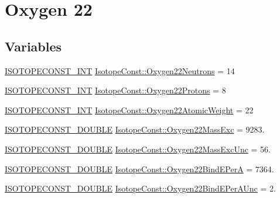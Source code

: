 \hypertarget{group___isotope_const-_oxygen-_o22}{}\section{Oxygen 22}
\label{group___isotope_const-_oxygen-_o22}
\subsection*{Variables}
\begin{DoxyCompactItemize}
\item 
\mbox{\hyperlink{group___isotope_const-_macros_ga5f18360b3e99483a35c32d789e62621c}{I\+S\+O\+T\+O\+P\+E\+C\+O\+N\+S\+T\+\_\+\+I\+NT}} \mbox{\hyperlink{group___isotope_const-_oxygen-_o22_gaab540bf3098885ffaa97b6f7363a1b3e}{Isotope\+Const\+::\+Oxygen22\+Neutrons}} = 14
\item 
\mbox{\hyperlink{group___isotope_const-_macros_ga5f18360b3e99483a35c32d789e62621c}{I\+S\+O\+T\+O\+P\+E\+C\+O\+N\+S\+T\+\_\+\+I\+NT}} \mbox{\hyperlink{group___isotope_const-_oxygen-_o22_ga3201a642435c22358206aefff772d6ca}{Isotope\+Const\+::\+Oxygen22\+Protons}} = 8
\item 
\mbox{\hyperlink{group___isotope_const-_macros_ga5f18360b3e99483a35c32d789e62621c}{I\+S\+O\+T\+O\+P\+E\+C\+O\+N\+S\+T\+\_\+\+I\+NT}} \mbox{\hyperlink{group___isotope_const-_oxygen-_o22_ga62ae155ee6c1689b5ac4e7338f58abd2}{Isotope\+Const\+::\+Oxygen22\+Atomic\+Weight}} = 22
\item 
\mbox{\hyperlink{group___isotope_const-_macros_ga8f45a7272ce02c0b4c65c44636ed719a}{I\+S\+O\+T\+O\+P\+E\+C\+O\+N\+S\+T\+\_\+\+D\+O\+U\+B\+LE}} \mbox{\hyperlink{group___isotope_const-_oxygen-_o22_gac89fcb1003fffecc83ee7ad3992a1fe1}{Isotope\+Const\+::\+Oxygen22\+Mass\+Exc}} = 9283.
\item 
\mbox{\hyperlink{group___isotope_const-_macros_ga8f45a7272ce02c0b4c65c44636ed719a}{I\+S\+O\+T\+O\+P\+E\+C\+O\+N\+S\+T\+\_\+\+D\+O\+U\+B\+LE}} \mbox{\hyperlink{group___isotope_const-_oxygen-_o22_gacb4b2a9167f8c9439bff7644a49f0099}{Isotope\+Const\+::\+Oxygen22\+Mass\+Exc\+Unc}} = 56.
\item 
\mbox{\hyperlink{group___isotope_const-_macros_ga8f45a7272ce02c0b4c65c44636ed719a}{I\+S\+O\+T\+O\+P\+E\+C\+O\+N\+S\+T\+\_\+\+D\+O\+U\+B\+LE}} \mbox{\hyperlink{group___isotope_const-_oxygen-_o22_ga26b81d13d47f204d8797848372bf8782}{Isotope\+Const\+::\+Oxygen22\+Bind\+E\+PerA}} = 7364.
\item 
\mbox{\hyperlink{group___isotope_const-_macros_ga8f45a7272ce02c0b4c65c44636ed719a}{I\+S\+O\+T\+O\+P\+E\+C\+O\+N\+S\+T\+\_\+\+D\+O\+U\+B\+LE}} \mbox{\hyperlink{group___isotope_const-_oxygen-_o22_ga17a1f8f0dc18285235b6aed2053f900f}{Isotope\+Const\+::\+Oxygen22\+Bind\+E\+Per\+A\+Unc}} = 2.

\end{DoxyCompactItemize}
